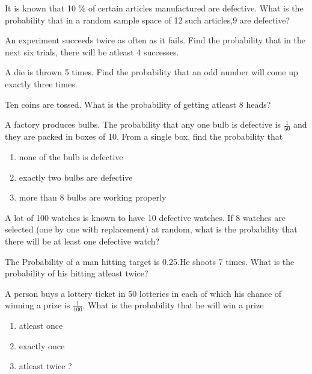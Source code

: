 \solution
\item It is known that 10 $\%$ of certain articles manufactured are defective. What is the probability that in a random sample space of 12 such articles,9 are defective? \\
\solution

\item An experiment succeeds twice as often as it fails. Find the probability that in the next
six trials, there will be atleast 4 successes.
\solution
\item A die is thrown 5 times. Find the probability that an odd number will come up exactly three times.
\solution

\item Ten coins are tossed. What is the probability of getting atleast 8 heads?
\\
\solution 

\item A factory produces bulbs. The probability that any one bulb is defective is $\frac{1}{50}$ and they are packed in boxes of 10. From a single box, find the probability that
\begin{enumerate}
    \item none of the bulb is defective 
    \item exactly two bulbs are defective 
    \item more than 8 bulbs are working properly
\end{enumerate}
\solution

\item A lot of 100 watches is known to have 10 defective watches. If 8 watches are
selected (one by one with replacement) at random, what is the probability that
there will be at least one defective watch?
\solution

\item The Probability of a man hitting  target is 0.25.He shoots 7 times. What is the probability of his hitting atleast twice?\\

\item A person buys a lottery ticket in 50 lotteries in each of which his chance of winning a prize is $\frac{1}{100}$. What is the probability that he will win a prize
\begin{enumerate}[label=(\alph*)]
    \item  atleast once 
    \item exactly once 
    \item atleast twice ?
\end{enumerate}


